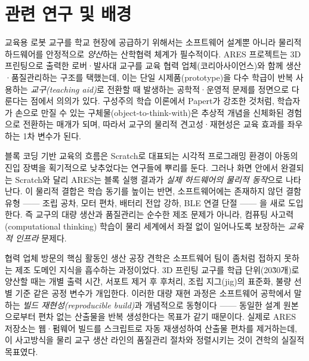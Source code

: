 

\section{관련 연구 및 배경}

교육용 로봇 교구를 학교 현장에 공급하기 위해서는 소프트웨어 설계뿐 아니라 물리적 하드웨어를 안정적으로 \emph{양산}하는 산학협력 체계가 필수적이다. ARES 프로젝트는 3D 프린팅으로 출력한 로버·발사대 교구를 교육 협력 업체(코리아사이언스)와 함께 생산·품질관리하는 구조를 택했는데, 이는 단일 시제품(prototype)을 다수 학급이 반복 사용하는 \emph{교구(teaching aid)}로 전환할 때 발생하는 공학적·운영적 문제를 정면으로 다룬다는 점에서 의의가 있다. 구성주의 학습 이론에서 Papert가 강조한 것처럼, 학습자가 손으로 만질 수 있는 구체물(object-to-think-with)은 추상적 개념을 신체화된 경험으로 전환하는 매개가 되며\cite{papert1980}, 따라서 교구의 물리적 견고성·재현성은 교육 효과를 좌우하는 1차 변수가 된다.

블록 코딩 기반 교육의 흐름은 Scratch로 대표되는 시각적 프로그래밍 환경이 아동의 진입 장벽을 획기적으로 낮추었다는 연구들에 뿌리를 둔다\cite{maloney2010scratch, resnick2009scratch}. 그러나 화면 안에서 완결되는 Scratch와 달리 ARES는 블록 실행 결과가 \emph{실제 하드웨어의 물리적 동작}으로 나타난다. 이 물리적 결합은 학습 동기를 높이는 반면, 소프트웨어에는 존재하지 않던 결함 유형 —— 조립 공차, 모터 편차, 배터리 전압 강하, BLE 연결 단절 —— 을 새로 도입한다. 즉 교구의 대량 생산과 품질관리는 순수한 제조 문제가 아니라, 컴퓨팅 사고력(computational thinking) 학습이 물리 세계에서 좌절 없이 일어나도록 보장하는 \emph{교육적 인프라} 문제다\cite{wing2006ct, brennan2012ct}.

협력 업체 방문의 핵심 활동인 생산 공장 견학은 소프트웨어 팀이 좀처럼 접하지 못하는 제조 도메인 지식을 흡수하는 과정이었다. 3D 프린팅 교구를 학급 단위(20\~30개)로 양산할 때는 개별 출력 시간, 서포트 제거 후 후처리, 조립 지그(jig)의 표준화, 불량 선별 기준 같은 공정 변수가 개입한다. 이러한 대량 재현 과정은 소프트웨어 공학에서 말하는 \emph{빌드 재현성(reproducible build)}과 개념적으로 동형이다 —— 동일한 설계 원본으로부터 편차 없는 산출물을 반복 생성한다는 목표가 같기 때문이다. 실제로 ARES 저장소는 웹·펌웨어 빌드를  스크립트로 자동 재생성하여 산출물 편차를 제거하는데\cite{ares-repo}, 이 사고방식을 물리 교구 생산 라인의 품질관리 절차와 정렬시키는 것이 견학의 실질적 목표였다.

